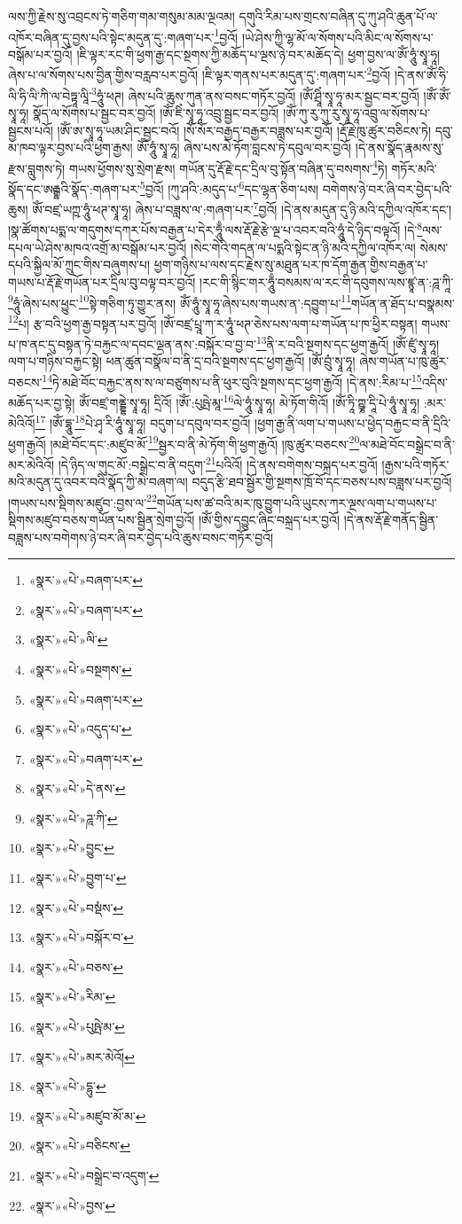 ལས་ཀྱི་རྗེས་སུ་འབྲངས་ཏེ་གཅིག་གམ་གསུམ་མམ་ལྔའམ། དགུའི་རིམ་པས་གྲངས་བཞིན་དུ་ཀུ་ཤའི་ཆུན་པོ་ལ་འཁོར་བཞིན་དུ་བྱས་པའི་སྟེང་མདུན་དུ་:གཞག་པར་\footnote{«སྣར་»«པེ་»བཞག་པར་}བྱའོ། །ཡེ་ཤེས་ཀྱི་ལྷ་མོ་ལ་སོགས་པའི་མིང་ལ་སོགས་པ་བསྒོམ་པར་བྱའོ། །ཇི་ལྟར་རང་གི་ཕྱག་རྒྱ་དང་སྔགས་ཀྱི་མཆོད་པ་ལྔས་ཉེ་བར་མཆོད་དེ། ཕྱག་བྱས་ལ་ཨོཾ་ཧཱུཾ་སྭཱ་ཧཱ། ཞེས་པ་ལ་སོགས་པས་བྱིན་གྱིས་བརླབ་པར་བྱའོ། །ཇི་ལྟར་གནས་པར་མདུན་དུ་:གཞག་པར་\footnote{«སྣར་»«པེ་»བཞག་པར་}བྱའོ། །དེ་ནས་ཨོཾ་ཧི་ལི་ཧི་ལི་ཀི་ལ་བེཏྟཱ་ལཱི་\footnote{«སྣར་»«པེ་»ལི་}ཧཱུཾ་ཕཊ། ཞེས་པའི་ཆུས་ཀུན་ནས་བསང་གཏོར་བྱའོ། །ཨོཾ་ཤྲཱིཾ་སྭཱ་ཧཱ་མར་སྦྱང་བར་བྱའོ། །ཨོཾ་ཨོཾ་སྭཱ་ཧཱ། སྣོད་ལ་སོགས་པ་སྦྱང་བར་བྱའོ། །ཨོཾ་ཇིཾ་སྭཱ་ཧཱ་འབྲུ་སྦྱང་བར་བྱའོ། །ཨོཾ་ཀུ་རུ་ཀུ་རུ་སྭཱ་ཧཱ་འབྲུ་ལ་སོགས་པ་སྦྱངས་པའོ། །ཨོཾ་ཨ་སྭཱ་ཧཱ་ཡམ་ཤིང་སྦྱང་བའོ། །སོ་སོར་བརྒྱད་བརྒྱར་བཟླས་པར་བྱའོ། །རྡོ་རྗེ་ཁུ་ཚུར་བཅིངས་ཏེ། དབུ་མ་ཁབ་ལྟར་བྱས་པའི་ཕྱག་རྒྱས། ཨོཾ་ཧཱུཾ་སྭཱ་ཧཱ། ཞེས་པས་མེ་ཏོག་བླངས་ཏེ་དབུལ་བར་བྱའོ། །དེ་ནས་སྣོད་རྣམས་སུ་རྫས་བླུགས་ཏེ། གཡས་ཕྱོགས་སུ་སྲེག་རྫས། གཡོན་དུ་རྡོ་རྗེ་དང་དྲིལ་བུ་སྟོན་བཞིན་དུ་བསགས་\footnote{«སྣར་»«པེ་»བསྔགས་}ཏེ། གཏོར་མའི་སྣོད་དང་ཨརྒྷའི་སྣོད་:གཞག་པར་\footnote{«སྣར་»«པེ་»བཞག་པར་}བྱའོ། །ཀུ་ཤའི་:མདུད་པ་\footnote{«སྣར་»«པེ་»འདུད་པ་}དང་ལྷན་ཅིག་པས། བགེགས་ཉེ་བར་ཞི་བར་བྱེད་པའི་ཆུས། ཨོཾ་བཛྲ་ཡཀྵ་ཧཱུཾ་ཕཊ་སྭཱ་ཧཱ། ཞེས་པ་བཟླས་ལ་:གཞག་པར་\footnote{«སྣར་»«པེ་»བཞག་པར་}བྱའོ། །དེ་ནས་མདུན་དུ་ཉི་མའི་དཀྱིལ་འཁོར་དང་། །སྣ་ཚོགས་པདྨ་ལ་གདུགས་དཀར་པོས་བརྒྱན་པ་དེར་ཧཱུྃ་ལས་རྡོ་རྗེ་རྩེ་ལྔ་པ་འབར་བའི་ཧཱུཾ་དེ་ཉིད་བལྟའོ། །དེ་\footnote{«སྣར་»«པེ་»དེ་ནས་}ལས་དཔལ་ཡེ་ཤེས་མཁའ་འགྲོ་མ་བསྒོམ་པར་བྱའོ། །སེང་གེའི་གདན་ལ་པདྨའི་སྟེང་ན་ཉི་མའི་དཀྱིལ་འཁོར་ལ། སེམས་དཔའི་སྐྱིལ་མོ་ཀྲུང་གིས་བཞུགས་པ། ཕྱག་གཉིས་པ་ལས་དང་རྗེས་སུ་མཐུན་པར་ཁ་དོག་རྒྱན་གྱིས་བརྒྱན་པ་གཡས་པ་རྡོ་རྗེ་གཡོན་པར་དྲིལ་བུ་བལྟ་བར་བྱའོ། །རང་གི་སྙིང་གར་ཧཱུྃ་བསམས་ལ་རང་གི་དབུགས་ལས་ཛྙཱ་ན་:ཌཱ་ཀཱི་\footnote{«སྣར་»«པེ་»ཌཱ་ཀི་}ཧཱུཾ་ཞེས་པས་ཕྱུང་\footnote{«སྣར་»«པེ་»བྱུང་}སྟེ་གཅིག་ཏུ་གྱུར་ནས། ཨོཾ་ཧཱུཾ་སྭཱ་ཧཱ་ཞེས་པས་གཡས་ན་:དབྱུག་པ་\footnote{«སྣར་»«པེ་»བྱུག་པ་}གཡོན་ན་ཐོད་པ་བསྣམས་\footnote{«སྣར་»«པེ་»བསྡཾས་}པ། རྩ་བའི་ཕྱག་རྒྱ་བསྟན་པར་བྱའོ། །ཨོཾ་བཛྲ་པྲཱ་ཀ་ར་ཧཱུཾ་ཕཊ་ཅེས་པས་ལག་པ་གཡོན་པ་ཁ་ཕྱིར་བསྟན། གཡས་པ་ཁ་ནང་དུ་བསྟན་ཏེ་བརྐྱང་ལ་དབང་ལྡན་ནས་:བསྐོར་བ་བྱ་བ་\footnote{«སྣར་»«པེ་»བསྐོར་བ་}ནི་ར་བའི་སྔགས་དང་ཕྱག་རྒྱའོ། །ཨོཾ་ཛུཾ་སྭཱ་ཧཱ། ལག་པ་གཉིས་བརྐྱང་སྟེ། ཕན་ཚུན་བསྣོལ་བ་ནི་དྲ་བའི་སྔགས་དང་ཕྱག་རྒྱའོ། །ཨོཾ་བྲུཾ་སྭཱ་ཧཱ། ཞེས་གཡོན་པ་ཁུ་ཚུར་བཅངས་\footnote{«སྣར་»«པེ་»བཅས་}ཏེ་མཐེ་བོང་བརྐྱང་ནས་ས་ལ་བཙུགས་པ་ནི་ཕུར་བུའི་སྔགས་དང་ཕྱག་རྒྱའོ། །དེ་ནས་:རིམ་པ་\footnote{«སྣར་»«པེ་»རིམ་}འདིས་མཆོད་པར་བྱ་སྟེ། ཨོཾ་བཛྲ་གནྡྷེ་སྭཱ་ཧཱ། དྲིའོ། །ཨོཾ་:པུཥྤེ་མཱ་\footnote{«སྣར་»«པེ་»པུཥྤེ་མ་}ལེ་ཧཱུཾ་སྭཱ་ཧཱ། མེ་ཏོག་གིའོ། །ཨོཾ་ཏཱི་ཀྵྞ་དཱི་པེ་ཧཱུཾ་སྭཱ་ཧཱ། :མར་མེའིའོ།\footnote{«སྣར་»«པེ་»མར་མེའོ།} །ཨོཾ་དྷཱུ་\footnote{«སྣར་»«པེ་»དྷུ་}པེ་ཤྭ་རི་ཧཱུཾ་སྭཱ་ཧཱ། བདུག་པ་དབུལ་བར་བྱའོ། །ཕྱག་རྒྱ་ནི་ལག་པ་གཡས་པ་ཕྱེད་བརྐྱང་བ་ནི་དྲིའི་ཕྱག་རྒྱའོ། །མཐེ་བོང་དང་:མཛུབ་མོ་\footnote{«སྣར་»«པེ་»མཛུབ་མོ་མ་}སྦྱར་བ་ནི་མེ་ཏོག་གི་ཕྱག་རྒྱའོ། །ཁུ་ཚུར་བཅངས་\footnote{«སྣར་»«པེ་»བཅིངས་}ལ་མཐེ་བོང་བསྒྲེང་བ་ནི་མར་མེའིའོ། །དེ་ཉིད་ལ་གུང་མོ་:བསྒྲེང་བ་ནི་བདུག་\footnote{«སྣར་»«པེ་»བསྒྲེང་བ་འདུག་}པའིའོ། །དེ་ནས་བགེགས་བསྐྲད་པར་བྱའོ། །རྒྱས་པའི་གཏོར་མའི་མདུན་དུ་འབར་བའི་སྣོད་ཀྱི་མེ་བཞག་ལ། བདུད་རྩི་ཐབ་སྦྱོར་གྱི་སྔགས་ཁྲོ་བོ་དང་བཅས་པས་བཟླས་པར་བྱའོ། །གཡས་པས་སྡིགས་མཛུབ་:བྱས་ལ་\footnote{«སྣར་»«པེ་»བྱས་}གཡོན་པས་ཚ་བའི་མར་ཁུ་བྱུག་པའི་ཡུངས་ཀར་ལྔས་ལག་པ་གཡས་པ་སྡིགས་མཛུབ་བཅས་གཡོན་པས་སྦྱིན་སྲེག་བྱའོ། །ཨོཾ་གྱིས་དབྱུང་ཞིང་བསྐྲད་པར་བྱའོ། །དེ་ནས་རྡོ་རྗེ་གནོད་སྦྱིན་བཟླས་པས་བགེགས་ཉེ་བར་ཞི་བར་བྱེད་པའི་ཆུས་བསང་གཏོར་བྱའོ། 